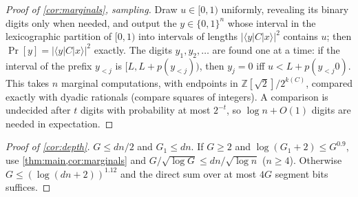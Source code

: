 \documentclass[10pt]{amsart}
\theoremstyle{plain}
\theoremstyle{definition}
\theoremstyle{remark}
\numberwithin{equation}{section}
\newcommand{\Z}{\mathbb{Z}}
\newcommand{\amp}[3]{\langle #1|#2|#3\rangle}
\begin{document}
\begin{proof}[Proof of \cref{cor:marginals}, sampling]
Draw $u\in[0,1)$ uniformly, revealing its binary digits only when needed, and output the
$y\in\{0,1\}^n$ whose interval in the lexicographic partition of $[0,1)$ into intervals of
lengths $|\amp{y}{C}{x}|^2$ contains $u$; then $\Pr[y]=|\amp{y}{C}{x}|^2$ exactly. The digits
$y_1,y_2,\dots$ are found one at a time: if the interval of the prefix $y_{<j}$ is
$[L,L+p(y_{<j}))$, then $y_j=0$ iff $u<L+p(y_{<j}0)$. This takes $n$ marginal computations,
with endpoints in $\Z[\sqrt2]/2^{k(C)}$, compared exactly with dyadic rationals (compare squares of
integers). A comparison is undecided after $t$ digits with probability at most $2^{-t}$, so
$\log n+O(1)$ digits are needed in expectation.
\end{proof}

\begin{proof}[Proof of \cref{cor:depth}]
$G\le dn/2$ and $G_1\le dn$. If $G\ge2$ and $\log(G_1+2)\le G^{0.9}$, use \cref{thm:main,cor:marginals}
and $G/\sqrt{\log G}\le dn/\sqrt{\log n}$ ($n\ge4$). Otherwise $G\le(\log(dn+2))^{1.12}$ and the
direct sum over at most $4G$ segment bits suffices.
\end{proof}
\end{document}
